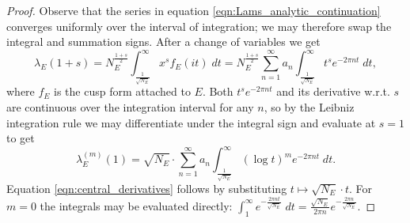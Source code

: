 \begin{proof}
Observe that the series in equation \ref{eqn:Lams_analytic_continuation} converges uniformly over the interval of integration; we may therefore swap the integral and summation signs. After a change of variables we get
\begin{equation*}
\lambda_E(1+s) = N_E^{\frac{1+s}{2}}  \int_{\frac{1}{\sqrt{N_E}}}^{\infty} x^s f_E(it) \; dt  = N_E^{\frac{1+s}{2}}  \sum_{n=1}^\infty a_n \int_{\frac{1}{\sqrt{N_E}}}^{\infty} t^s e^{-2\pi nt} \; dt,
\end{equation*}
where $f_E$ is the cusp form attached to $E$. Both $t^s e^{-2\pi nt}$ and its derivative w.r.t. $s$ are continuous over the integration interval for any $n$, so by the Leibniz integration rule we may differentiate under the integral sign and evaluate at $s=1$ to get
\begin{equation}\label{eqn:lambda_derivs}
\lambda_E^{(m)}(1) = \sqrt{N_E}\cdot \sum_{n=1}^\infty a_n \int_{\frac{1}{\sqrt{N_E}}}^{\infty} (\log t)^m e^{-2\pi n t} \; dt.
\end{equation}
Equation \ref{eqn:central_derivatives} follows by substituting $t \mapsto \sqrt{N_E} \cdot t$. For $m=0$ the integrals may be evaluated directly: $\int_{1}^{\infty} e^{-\frac{2\pi n t}{\sqrt{N_E}}} \; dt = \frac{\sqrt{N_E}}{2\pi n} e^{-\frac{2\pi n}{\sqrt{N_E}}}$.
\end{proof}



